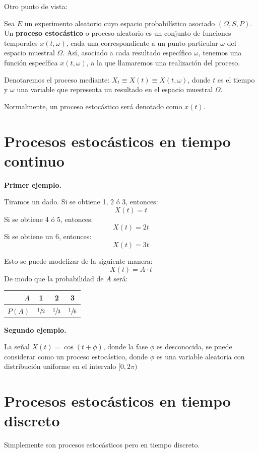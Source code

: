 \documentclass[a4paper]{book}
\begin{document}
Otro punto de vista:

Sea $E$ un experimento aleatorio cuyo espacio probabilístico asociado $(\Omega , S, P)$. Un \textbf{proceso estocástico} o proceso aleatorio es un conjunto de funciones temporales $x(t,\omega )$, cada una correspondiente a un punto particular $\omega$ del espacio muestral $\Omega$. Así, asociado a cada resultado específico $\omega$, tenemos una función específica $x(t,\omega )$, a la que llamaremos una realización del proceso.

Denotaremos el proceso mediante: $X_t\equiv X(t) \equiv X(t,\omega )$, donde $t$ es el tiempo y $\omega$ una variable que representa un resultado en el espacio muestral $\Omega$.

Normalmente, un proceso estocástico será denotado como $x(t)$.

\section{Procesos estocásticos en tiempo continuo}
\textbf{Primer ejemplo.}

Tiramos un dado. Si se obtiene 1, 2 ó 3, entonces:
\[X(t) = t\]
Si se obtiene 4 ó 5, entonces:
\[X(t) = 2t\]
Si se obtiene un 6, entonces:
\[X(t) = 3t\]

Esto se puede modelizar de la siguiente manera:
\[X(t) = A\cdot t\]
De modo que la probabilidad de $A$ será:
\begin{center}
	\begin{tabular}{r || c | c | c}
		$A$    & 1              & 2              & 3              \\ \hline
		$P(A)$ & $\sfrac{1}{2}$ & $\sfrac{1}{3}$ & $\sfrac{1}{6}$
	\end{tabular}
\end{center}

\textbf{Segundo ejemplo.}

La señal $X(t) = \cos\left( t+\phi \right)$, donde la fase $\phi$ es desconocida, se puede considerar como un proceso estocástico, donde $\phi$ es una variable aleatoria con distribución uniforme en el intervalo $[0, 2\pi )$




\section{Procesos estocásticos en tiempo discreto}

Simplemente son procesos estocásticos pero en tiempo discreto.
\end{document}
